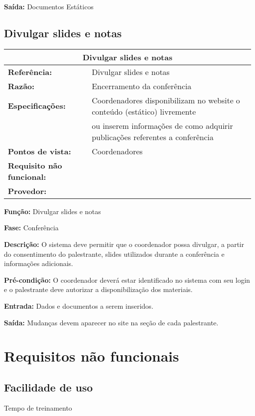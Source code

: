 \documentclass[letter]{article}
\begin{document}
\textbf{Saída:}  Documentos Estáticos

\newpage
\subsection{Divulgar slides e notas}


\begin{table}[h!]

\begin{center}
\begin{tabular}{|ll|}
\hline 
\multicolumn{2}{|c|}{\textbf{Divulgar slides e notas}}\tabularnewline
\hline
\textbf{Referência:} & Divulgar slides e notas\tabularnewline
\textbf{Razão:} & Encerramento da conferência\tabularnewline
\textbf{Especificações:} &  Coordenadores disponibilizam no website o conteúdo
(estático) livremente\tabularnewline
 & ou inserem informações de como adquirir publicações referentes a conferência\tabularnewline
\textbf{Pontos de vista:} & Coordenadores\tabularnewline
\textbf{Requisito não funcional:} & \tabularnewline
\textbf{Provedor:} & \tabularnewline
\hline
\end{tabular}

\end{center}
\end{table}


\textbf{Função:} Divulgar slides e notas

\textbf{Fase:}  Conferência

\textbf{Descrição:}  O sistema deve permitir que o coordenador possa divulgar, a partir do consentimento do palestrante, slides utilizados durante a conferência e informações adicionais.

\textbf{Pré-condição:}  O coordenador deverá estar identificado no sistema com seu login e o palestrante deve autorizar a disponibilização dos materiais.

\textbf{Entrada:}  Dados e documentos a serem inseridos.

\textbf{Saída:}  Mudanças devem aparecer no site na seção de cada palestrante.

%

 





\section{Requisitos não funcionais}

\subsection{ Facilidade de uso}
\textbullet Tempo de treinamento
\end{document}

